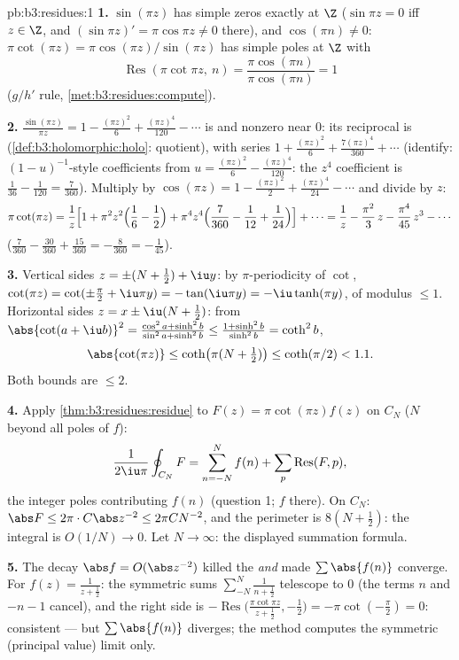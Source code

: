 \begin{solution}{pb:b3:residues:1}
\textbf{1.} $\sin(\pi z)$ has simple zeros exactly at $\Z$
($\sin\pi z = 0$ iff $z \in \Z$, and $(\sin\pi z)' = \pi\cos\pi
z \neq 0$ there), and $\cos(\pi n) \neq 0$: $\pi\cot(\pi z) =
\pi\cos(\pi z)/\sin(\pi z)$ has simple poles at $\Z$ with
\[
\operatorname{Res}(\pi\cot\pi z,\ n)
= \frac{\pi\cos(\pi n)}{\pi\cos(\pi n)} = 1
\]
($g/h'$ rule, \cref{met:b3:residues:compute}).

\textbf{2.} $\frac{\sin(\pi z)}{\pi z} = 1 - \frac{(\pi z)^2}6
+ \frac{(\pi z)^4}{120} - \cdots$ is  and nonzero
near $0$: its reciprocal is 
(\cref{def:b3:holomorphic:holo}: quotient), with series $1 +
\frac{(\pi z)^2}{6} + \frac{7(\pi z)^4}{360} + \cdots$
(identify: $(1 - u)^{-1}$-style coefficients from $u =
\frac{(\pi z)^2}6 - \frac{(\pi z)^4}{120}$: the $z^4$
coefficient is $\frac1{36} - \frac1{120} = \frac{7}{360}$).
Multiply by $\cos(\pi z) = 1 - \frac{(\pi z)^2}2 + \frac{(\pi
z)^4}{24} - \cdots$ and divide by $z$:
\[
\pi\cot(\pi z) = \frac1z\Bigl[1 + \pi^2z^2\Bigl(\frac16 -
\frac12\Bigr) + \pi^4z^4\Bigl(\frac7{360} - \frac1{12} +
\frac1{24}\Bigr)\Bigr] + \cdots
= \frac1z - \frac{\pi^2}3\,z - \frac{\pi^4}{45}\,z^3 -
\cdots
\]
($\frac7{360} - \frac{30}{360} + \frac{15}{360} =
-\frac8{360} = -\frac1{45}$).

\textbf{3.} Vertical sides $z = \pm(N + \frac12) + \iu y$:
by $\pi$-periodicity of $\cot$, $\cot(\pi z) = \cot(\pm\frac\pi2
+ \iu\pi y) = -\tan(\iu\pi y) = -\iu\tanh(\pi y)$, of modulus
$\leq 1$. Horizontal sides $z = x \pm \iu(N + \frac12)$: from
$\abs{\cot(a + \iu b)}^2 = \frac{\cos^2a +
\sinh^2b}{\sin^2a + \sinh^2b} \leq \frac{1 +
\sinh^2b}{\sinh^2b} = \coth^2 b$,
\[
\abs{\cot(\pi z)} \leq \coth\bigl(\pi(N + \tfrac12)\bigr)
\leq \coth(\pi/2) < 1.1 .
\]
Both bounds are $\leq 2$.

\textbf{4.} Apply \cref{thm:b3:residues:residue} to $F(z) =
\pi\cot(\pi z)f(z)$ on $C_N$ ($N$ beyond all poles of $f$):
\[
\frac1{2\iu\pi}\oint_{C_N}F = \sum_{n=-N}^{N}f(n) +
\sum_p\operatorname{Res}(F, p),
\]
the integer poles contributing $f(n)$ (question 1; $f$
 there). On $C_N$: $\abs F \leq 2\pi\cdot
C\abs z^{-2} \leq 2\pi C N^{-2}$, and the perimeter is $8(N +
\frac12)$: the integral is $O(1/N) \to 0$. Let $N \to
\infty$: the displayed summation formula.

\textbf{5.} The decay $\abs f = O(\abs z^{-2})$ killed the
 \emph{and} made $\sum\abs{f(n)}$ converge.
For $f(z) = \frac1{z + \frac12}$: the symmetric sums
$\sum_{-N}^N\frac1{n + \frac12}$ telescope to $0$ (the terms
$n$ and $-n - 1$ cancel), and the right side is
$-\operatorname{Res}\bigl(\frac{\pi\cot\pi z}{z + \frac12},
-\frac12\bigr) = -\pi\cot(-\frac\pi2) = 0$: consistent ---
but $\sum\abs{f(n)}$ diverges; the method computes the
symmetric (principal value) limit only.


\end{solution}

